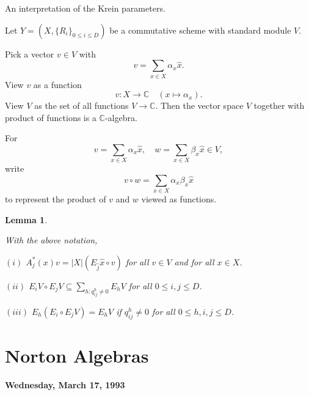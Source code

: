\documentclass[
]{book}
\newtheorem{lemma}{Lemma}[chapter]
\theoremstyle{definition}
\theoremstyle{definition}
\theoremstyle{definition}
\theoremstyle{definition}
\theoremstyle{remark}
\begin{document}
An interpretation of the Krein parameters.

Let \(Y = (X, \{R_i\}_{0\leq i\leq D})\) be a commutative scheme with standard module \(V\).

Pick a vector \(v\in V\) with
\[v = \sum_{x\in X}\alpha_x \hat{x}.\]
View \(v\) as a function
\[v: X\longrightarrow \mathbb{C} \quad (x\mapsto \alpha_x).\]
View \(V\) as the set of all functions \(V \longrightarrow \mathbb{C}\). Then the vector space \(V\) together with product of functions is a \(\mathbb{C}\)-algebra.

For
\[v = \sum_{x\in X}\alpha_x \hat{x}, \quad w = \sum_{x\in X}\beta_x \hat{x} \in V,\]
write
\[v\circ w = \sum_{x\in X}\alpha_x\beta_x \hat{x}\]
to represent the product of \(v\) and \(w\) viewed as functions.

\begin{lemma}
\protect\hypertarget{lem:vector-function-product}{}\label{lem:vector-function-product}

With the above notation,

\((i)\) \(A^*_j(x)v = |X|(E_{\hat{j}}\hat{x}\circ v)\) for all \(v\in V\) and for all \(x\in X\).

\((ii)\) \(E_iV\circ E_jV \subseteq \sum_{h: q^h_{ij}\neq 0} E_hV\) for all \(0\leq i, j\leq D\).

\((iii)\) \(E_h(E_i\circ E_jV) = E_hV\) if \(q^h_{ij}\neq 0\) for all \(0\leq h, i, j\leq D\).

\end{lemma}

\hypertarget{lec21}{%
\chapter{Norton Algebras}\label{lec21}}

\textbf{Wednesday, March 17, 1993}
\end{document}
